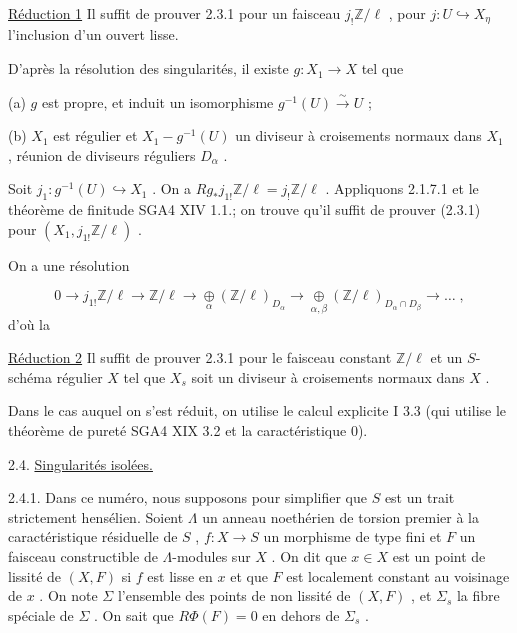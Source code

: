 \underline{Réduction 1}  Il suffit de prouver 2.3.1 pour un faisceau $j_{!} \mathbb{Z}/\ell$ , pour $j : U \hookrightarrow X_{\eta}$ l'inclusion d'un ouvert lisse.

D'après la résolution des singularités, il existe $g : X_{1} \to X$ tel que

(a)  $g$ est propre, et induit un isomorphisme $g^{-1}(U) \overset{\sim}{\longrightarrow} U$ ;

(b)  $X_{1}$ est régulier et $X_{1} - g^{-1}(U)$ un diviseur à croisements normaux dans $X_{1}$ , réunion de diviseurs réguliers $D_{\alpha}$ .

Soit $j_{1} : g^{-1}(U) \hookrightarrow X_{1}$ . On a $Rg_{*} j_{1!} \mathbb{Z}/\ell = j_{!} \mathbb{Z}/\ell$ . Appliquons 2.1.7.1 et le théorème de finitude SGA4 XIV 1.1.; on trouve qu'il suffit de prouver (2.3.1) pour $(X_{1}, j_{1!} \mathbb{Z}/\ell)$ .

On a une résolution

\begin{equation*}
0 \longrightarrow j_{1!}\mathbb{Z}/\ell \longrightarrow \mathbb{Z}/\ell \longrightarrow \underset{\alpha}{\oplus} (\mathbb{Z}/\ell)_{D_{\alpha}} \longrightarrow \underset{\alpha,\beta}{\oplus} (\mathbb{Z}/\ell)_{D_{\alpha} \cap D_{\beta}} \longrightarrow \ldots \; ,
\end{equation*}
d'où la

\underline{Réduction 2}  Il suffit de prouver 2.3.1 pour le faisceau constant $\mathbb{Z}/\ell$ et un $S$-schéma régulier $X$ tel que $X_{s}$ soit un diviseur à croisements normaux dans $X$ .

Dans le cas auquel on s'est réduit, on utilise le calcul explicite I 3.3 (qui utilise le théorème de pureté SGA4 XIX 3.2 et la caractéristique 0).


2.4.  \underline{Singularités isolées.}

2.4.1.  Dans ce numéro, nous supposons pour simplifier que $S$ est un trait strictement hensélien. Soient $\Lambda$ un anneau noethérien de torsion premier à la caractéristique résiduelle de $S$ , $f : X \to S$ un morphisme de type fini et $F$ un faisceau constructible de $\Lambda$-modules sur $X$ . On dit que $x \in X$ est un point de lissité de
$(X, F)$ si $f$ est lisse en $x$ et que $F$ est localement constant au voisinage de $x$ . On note $\Sigma$ l'ensemble des points de non lissité de $(X, F)$ , et $\Sigma_s$ la fibre spéciale de $\Sigma$ . On sait que $R\Phi(F) = 0$ en dehors de $\Sigma_s$ .

